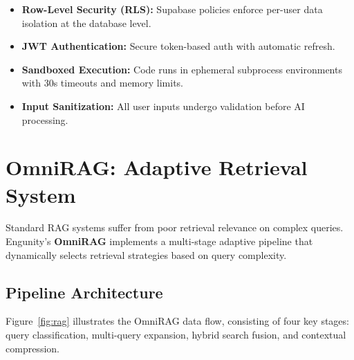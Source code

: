 \documentclass[conference]{IEEEtran}
\begin{document}
\begin{itemize}
    \item \textbf{Row-Level Security (RLS):} Supabase policies enforce per-user data isolation at the database level.
    \item \textbf{JWT Authentication:} Secure token-based auth with automatic refresh.
    \item \textbf{Sandboxed Execution:} Code runs in ephemeral subprocess environments with 30s timeouts and memory limits.
    \item \textbf{Input Sanitization:} All user inputs undergo validation before AI processing.
\end{itemize}


\section{OmniRAG: Adaptive Retrieval System}

Standard RAG systems suffer from poor retrieval relevance on complex queries. Engunity's \textbf{OmniRAG} implements a multi-stage adaptive pipeline that dynamically selects retrieval strategies based on query complexity.

\subsection{Pipeline Architecture}

Figure~\ref{fig:rag} illustrates the OmniRAG data flow, consisting of four key stages: query classification, multi-query expansion, hybrid search fusion, and contextual compression.
\end{document}
